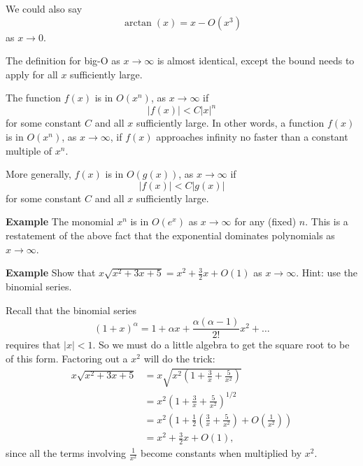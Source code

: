 \documentclass[a4paper]{book}
\begin{document}
\begin{sloppypar}
\begin{examplebox}
We could also say \[ \arctan(x)= x - O(x^3) \] as $x \rightarrow 0$.
\end{examplebox}

The definition for big-O as $x \rightarrow \infty$ is almost identical, except the bound needs to apply for all $x$ sufficiently large.

\begin{definitionbox}[title=\textbf{Big-O notation, $x \rightarrow \infty$}]
The function $f(x)$ is in $O(x^n)$, as $x \rightarrow \infty$ if \[ |f(x)| < C|x|^n \] for some constant $C$ and all $x$ sufficiently large. In other words, a function $f(x)$ is in $O(x^n)$, as $x \rightarrow \infty$, if $f(x)$ approaches infinity no faster than a constant multiple of $x^n$.

More generally, $f(x)$ is in $O(g(x))$, as $x \rightarrow \infty$ if \[ |f(x)| < C |g(x)| \] for some constant $C$ and all $x$ sufficiently large.
\end{definitionbox}

\textbf{Example} The monomial $x^n$ is in $O(e^x)$ as $x \rightarrow \infty$ for any (fixed) $n$. This is a restatement of the above fact that the exponential dominates polynomials as $x \rightarrow \infty$.

\textbf{Example} Show that $x \sqrt{x^2 + 3x + 5} = x^2 + \frac{3}{2}x + O(1)$ as $x \rightarrow \infty$. Hint: use the binomial series.
\begin{examplebox}
Recall that the binomial series \[ (1+x)^\alpha = 1 + \alpha x + \frac{\alpha (\alpha - 1)}{2!} x^2 + \ldots \] requires that $|x|<1$. So we must do a little algebra to get the square root to be of this form. Factoring out a $x^2$ will do the trick:
\begin{align*} 
x \sqrt{x^2+3x+5} &= x \sqrt{x^2 \left( 1 + \frac{3}{x} + \frac{5}{x^2} \right)} \\
&= x^2 \left(1 + \frac{3}{x} + \frac{5}{x^2} \right)^{1/2} \\
&= x^2 \left( 1 + \frac{1}{2}\left(\frac{3}{x} + \frac{5}{x^2}\right) + O\left(\frac{1}{x^2}\right) \right) \\
&= x^2 + \frac{3}{2}x + O(1), 
\end{align*}
since all the terms involving $\frac{1}{x^2}$ become constants when multiplied by $x^2$.
\end{examplebox}


\end{sloppypar}
\end{document}
